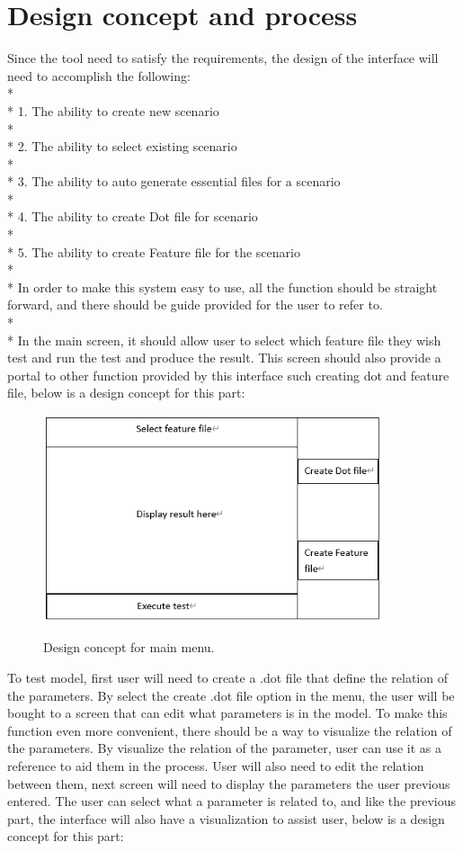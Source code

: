 \section{Design concept and process}
Since the tool need to satisfy the requirements, the design of the interface will need to accomplish the following:\\*
\\*
1.	The ability to create new scenario\\*
\\*
2.	The ability to select existing scenario\\*
\\*
3.	The ability to auto generate essential files for a scenario\\*
\\*
4.	The ability to create Dot file for scenario\\*
\\*
5.	The ability to create Feature file for the scenario\\*
\\*
In order to make this system easy to use, all the function should be straight forward, and there should be guide provided for the user to refer to. \\*\\*
In the main screen, it should allow user to select which feature file they wish test and run the test and produce the result. This screen should also provide a portal to other function provided by this interface such creating dot and feature file, below is a design concept for this part:

\begin{figure}[H]
	\centering
	\includegraphics[width=10cm]{figures/mainMenu.png}\\
	\caption{Design concept for main menu.}
	\label{fig:figure4}
\end{figure}
To test model, first user will need to create a .dot file that define the relation of the parameters. By select the create .dot file option in the menu, the user will be bought to a screen that can edit what parameters is in the model. To make this function even more convenient, there should be a way to visualize the relation of the parameters. By visualize the relation of the parameter, user can use it as a reference to aid them in the process. User will also need to edit the relation between them, next screen will need to display the parameters the user previous entered. The user can select what a parameter is related to, and like the previous part, the interface will also have a visualization to assist user, below is a design concept for this part:

